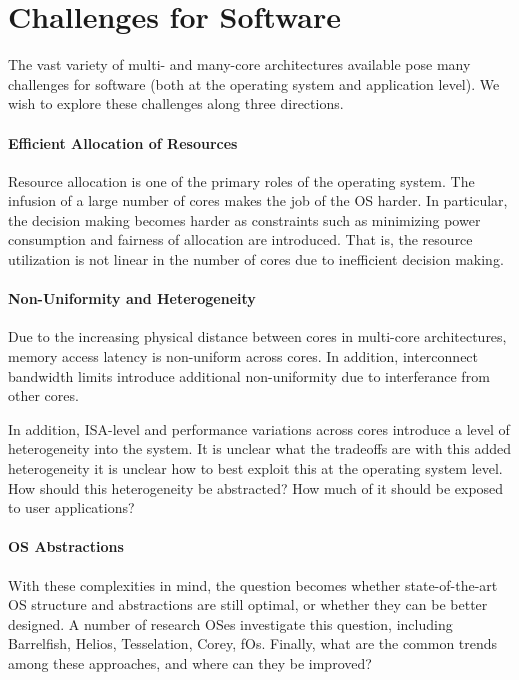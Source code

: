 \section{Challenges for Software}
\label{sec:challenges}

The vast variety of multi- and many-core architectures available pose many challenges for
software (both at the operating system and application level). We wish to explore these
challenges along three directions.

\paragraph{Efficient Allocation of Resources}

Resource allocation is one of the primary roles of the operating system. The infusion of a
large number of cores makes the job of the OS harder. In particular, the decision making
becomes harder as constraints such as minimizing power consumption and fairness of allocation
are introduced. That is, the resource utilization is not linear in the number of cores due to
inefficient decision making.

\paragraph{Non-Uniformity and Heterogeneity}

Due to the increasing physical distance between cores in multi-core architectures, memory
access latency is non-uniform across cores. In addition, interconnect bandwidth limits
introduce additional non-uniformity due to interferance from other cores.

In addition, ISA-level and performance variations across cores introduce a level of
heterogeneity into the system. It is unclear what the tradeoffs are with this added
heterogeneity it is unclear how to best exploit this at the operating system level. How
should this heterogeneity be abstracted? How much of it should be exposed to user
applications?

\paragraph{OS Abstractions}

With these complexities in mind, the question becomes whether state-of-the-art
OS structure and abstractions are still optimal, or whether they can be better designed.
A number of research OSes investigate this question, including Barrelfish, Helios, Tesselation, Corey, fOs.
Finally, what are the common trends among these approaches, and where can they be improved?

